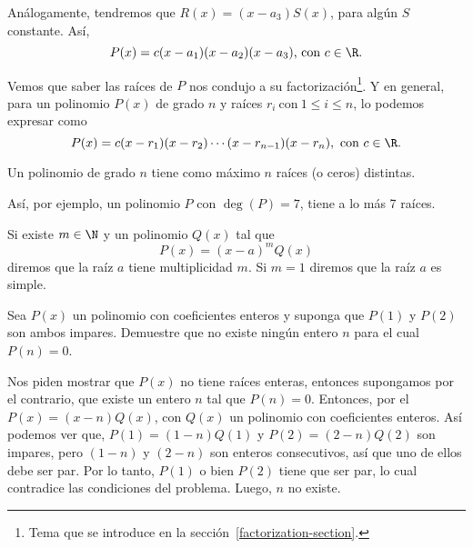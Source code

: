 Análogamente, tendremos que $R(x) = (x - a_3)S(x)$, para algún $S$ constante.
Así,
\[
    P(x) = c(x - a_1)(x - a_2)(x - a_3) \mbox{, con } c \in \R.
\]

Vemos que saber las raíces de $P$ nos condujo a su factorización\footnote{Tema que se introduce en la sección~\ref{factorization-section}.}.
Y en general, para un polinomio $P(x)$ de grado $n$ y raíces $r_i \ \text{con} \ 1 \leq i \leq n$, lo podemos expresar como
\[
    P(x) = c(x - r_1)(x - r_2)\cdots(x - r_{n-1})(x - r_n),\ \text{con}\ c \in \R.
\]

\begin{section-definition.tcb}\label{numbers-of-roots}
    Un polinomio de grado $n$ tiene como máximo $n$ raíces (o ceros) distintas.
\end{section-definition.tcb}

Así, por ejemplo, un polinomio $P$ con $\deg{(P)} = 7$, tiene a lo más 7 raíces.

\begin{section-definition.tcb}
    Si existe $m \in \N$ y un polinomio $Q(x)$ tal que
    \[
        P(x) = (x - a)^m Q(x)
    \]
    diremos que la raíz $a$ tiene multiplicidad $m$.
    Si $m = 1$ diremos que la raíz $a$ es simple.
\end{section-definition.tcb}

\begin{section-example.tcb}
    Sea $P(x)$ un polinomio con coeficientes enteros y suponga que $P(1)$ y $P(2)$ son ambos impares.
    Demuestre que no existe ningún entero $n$ para el cual $P(n) = 0$.
\end{section-example.tcb}
\begin{solution}
    Nos piden mostrar que $P(x)$ no tiene raíces enteras, entonces supongamos por el contrario, que existe un entero $n$ tal que $P(n) = 0$.
    Entonces, por el  $P(x) = (x - n)Q(x)$, con $Q(x)$ un polinomio con coeficientes enteros.
    Así podemos ver que, $P(1) = (1 - n)Q(1)$ y $P(2) = (2 - n)Q(2)$ son impares, pero $(1 - n)$ y $(2 - n)$ son enteros consecutivos, así que uno de ellos debe ser par.
    Por lo tanto, $P(1)$ o bien $P(2)$ tiene que ser par, lo cual contradice las condiciones del problema.
    Luego, $n$ no existe.
\end{solution}

